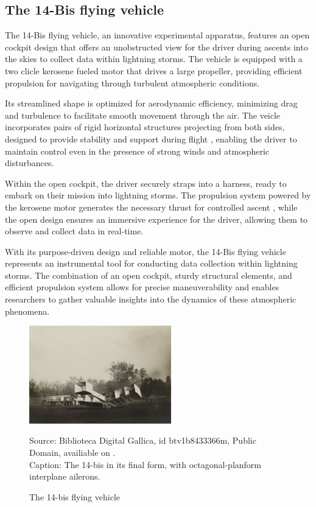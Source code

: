 \documentclass[english]{cenarticle}
\begin{document}
\subsection{The 14-Bis flying vehicle}
The 14-Bis flying vehicle, an innovative experimental apparatus, features an open cockpit design that offers an unobstructed view for the driver during ascents into the skies to collect data within lightning storms. The vehicle is equipped with a two clicle kerosene fueled motor \citep{Torrens1992} that drives a large propeller, providing efficient propulsion for navigating through turbulent atmospheric conditions.\par
%
Its streamlined shape is optimized for aerodynamic efficiency, minimizing drag and turbulence to facilitate smooth movement through the air. The veicle incorporates pairs of rigid horizontal structures projecting from both sides, designed to provide stability and support during flight \citep{Wipo}, enabling the driver to maintain control even in the presence of strong winds and atmospheric disturbances.\par
%
Within the open cockpit, the driver securely straps into a harness, ready to embark on their mission into lightning storms. The propulsion system powered by the kerosene motor generates the necessary thrust for controlled ascent \citep{Torrens1992}, while the open design ensures an immersive experience for the driver, allowing them to observe and collect data in real-time.\par
%
With its purpose-driven design and reliable motor, the 14-Bis flying vehicle represents an instrumental tool for conducting data collection within lightning storms. The combination of an open cockpit, sturdy structural elements, and efficient propulsion system allows for precise maneuverability and enables researchers to gather valuable insights into the dynamics of these atmospheric phenomena.
%
\begin{figure}[!h]
  \caption{The 14-bis flying vehicle}
  \vspace{-3mm} 
  \begin{center}
    \includegraphics[width=0.55\textwidth, trim={0 0 0 0},clip]{images/14-bis.jpeg}
  \end{center}
  {\footnotesize
  Source: Biblioteca Digital Gallica, id btv1b8433366m, Public Domain, availiable on \citep{Beau1907}.\\
  Caption: The 14-bis in its final form, with octagonal-planform interplane ailerons.}
    \label{fig:triangle2}
  \end{figure}
\end{document}
